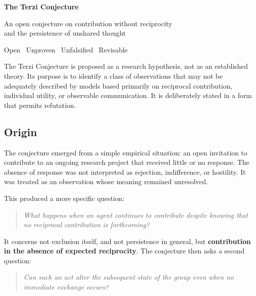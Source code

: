 \documentclass[10pt,twocolumn]{article}
\begin{document}
\onecolumn

\vspace*{2em}
{\centering
{\Huge\bfseries\textcolor{deepblue}{The Terzi Conjecture}\par}
\vspace{0.8em}
{\large\textcolor{headinggray}{An open conjecture on contribution without reciprocity\\[0.2em] and the persistence of unshared thought}\par}
\vspace{1.2em}
{\small\textcolor{headinggray}{Open \textperiodcentered\ Unproven \textperiodcentered\ Unfalsified \textperiodcentered\ Revisable}}
\vspace{1.5em}
\par}

The Terzi Conjecture is proposed as a research hypothesis, not as an established theory. Its purpose is to identify a class of observations that may not be adequately described by models based primarily on reciprocal contribution, individual utility, or observable communication. It is deliberately stated in a form that permits refutation.

\subsection*{Origin}

The conjecture emerged from a simple empirical situation: an open invitation to contribute to an ongoing research project that received little or no response. The absence of response was not interpreted as rejection, indifference, or hostility. It was treated as an observation whose meaning remained unresolved.

This produced a more specific question:

\begin{quote}
\emph{What happens when an agent continues to contribute despite knowing that no reciprocal contribution is forthcoming?}
\end{quote}

It concerns not exclusion itself, and not persistence in general, but \textbf{contribution in the absence of expected reciprocity}.
The conjecture then asks a second question:

\begin{quote}
\emph{Can such an act alter the subsequent state of the group even when no immediate exchange occurs?}
\end{quote}
\end{document}
